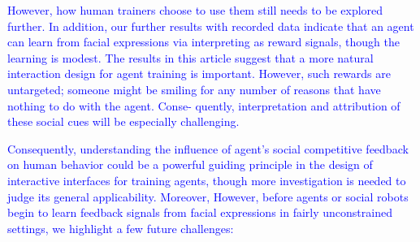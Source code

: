 \textcolor{blue}{%
However, how human trainers choose to use them still needs to be explored further. In addition, our further results with recorded data indicate that an agent can learn from facial expressions via interpreting as reward signals, though the learning is modest. The results in this article suggest that a more natural interaction design for agent training is important. However, such rewards are untargeted; someone might be smiling for any number of reasons that have nothing to do with the agent. Conse- quently, interpretation and attribution of these social cues will be especially challenging. }%

\textcolor{blue}{Consequently, understanding the influence of agent's social competitive feedback %
on human behavior could be a powerful guiding principle in the design of interactive interfaces for training agents, though more investigation is needed to judge its general applicability. Moreover, 
However, before agents or social robots begin to learn feedback signals from facial expressions in fairly unconstrained settings, we highlight a few future challenges: }%

